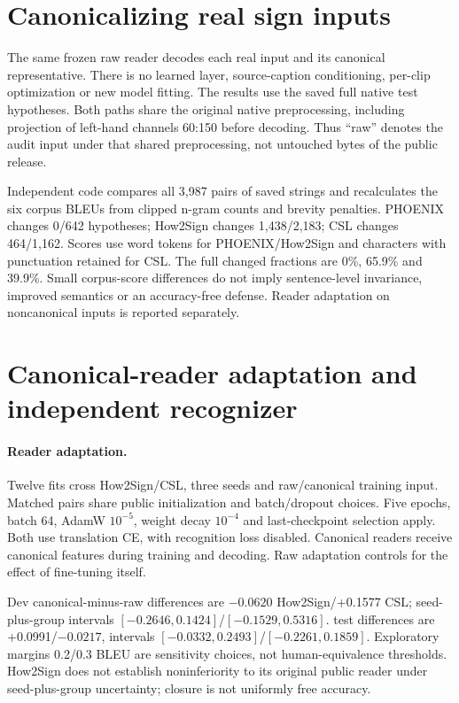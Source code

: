 \documentclass[10pt,twocolumn,letterpaper]{article}
\begin{document}
\section{Canonicalizing real sign inputs}

The same frozen raw reader decodes each real input and its canonical representative. There is no learned layer, source-caption conditioning, per-clip optimization or new model fitting. The results use the saved full native test hypotheses. Both paths share the original native preprocessing, including projection of left-hand channels 60:150 before decoding. Thus ``raw'' denotes the audit input under that shared preprocessing, not untouched bytes of the public release.

Independent code compares all 3,987 pairs of saved strings and recalculates the six corpus BLEUs from clipped n-gram counts and brevity penalties. PHOENIX changes 0/642 hypotheses; How2Sign changes 1,438/2,183; CSL changes 464/1,162. Scores use word tokens for PHOENIX/How2Sign and characters with punctuation retained for CSL. The full changed fractions are 0\%, 65.9\% and 39.9\%. Small corpus-score differences do not imply sentence-level invariance, improved semantics or an accuracy-free defense. Reader adaptation on noncanonical inputs is reported separately.


\section{Canonical-reader adaptation and independent recognizer}
\paragraph{Reader adaptation.}
Twelve fits cross How2Sign/CSL, three seeds and raw/canonical training input. Matched pairs share public initialization and batch/dropout choices. Five epochs, batch 64, AdamW $10^{-5}$, weight decay $10^{-4}$ and last-checkpoint selection apply. Both use translation CE, with recognition loss disabled. Canonical readers receive canonical features during training and decoding. Raw adaptation controls for the effect of fine-tuning itself.

Dev canonical-minus-raw differences are $-0.0620$ How2Sign/+0.1577 CSL; seed-plus-group intervals $[-0.2646,0.1424]$/$[-0.1529,0.5316]$. test differences are +0.0991/$-0.0217$, intervals $[-0.0332,0.2493]$/$[-0.2261,0.1859]$. Exploratory margins 0.2/0.3 BLEU are sensitivity choices, not human-equivalence thresholds. How2Sign does not establish noninferiority to its original public reader under seed-plus-group uncertainty; closure is not uniformly free accuracy.
\end{document}
